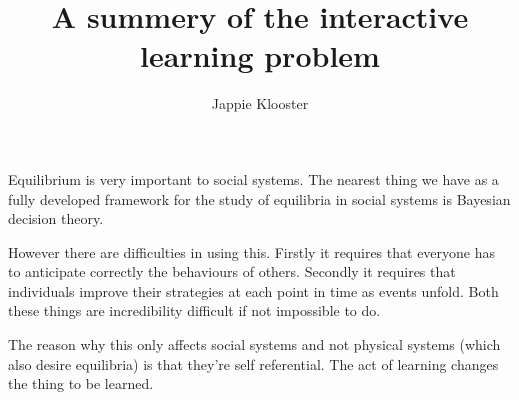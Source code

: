 \documentclass{article}
\begin{document}
\author{Jappie Klooster}
\title{A summery of the interactive learning problem}

\maketitle

Equilibrium is very important to social systems. The nearest
thing we have as a fully developed framework for the study of
equilibria in social systems is Bayesian decision theory.

However there are difficulties in using this. Firstly it requires that
everyone has to anticipate correctly the behaviours of others.
Secondly it requires that individuals improve their strategies
at each point in time as events unfold.
Both these things are incredibility difficult if not impossible to do.

The reason why this only affects social systems and not physical systems
(which also desire equilibria) is that they're self referential.
The act of learning changes the thing to be learned.
\end{document}
